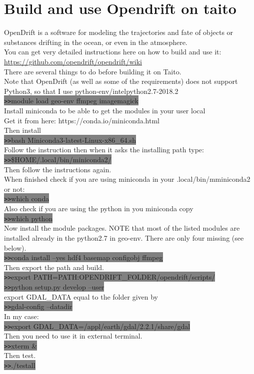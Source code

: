 \documentclass[11pt]{article}
\begin{document}
\section{Build and use Opendrift on taito}
OpenDrift is a software for modeling the trajectories and fate of objects or substances drifting in the ocean, or even in the atmosphere.\\
You can get very detailed instructions here on how to build and use it:\\
\url{https://github.com/opendrift/opendrift/wiki}\\
There are several things to do before building it on Taito.\\
Note that OpenDrift (as well as some of the requirements) does not support Python3, so that I use python-env/intelpython2.7-2018.2\\
\colorbox{Grey}{\texttt{>>}module load geo-env ffmpeg imagemagick}\\
Install miniconda to be able to get the modules in your user local\\
Get it from here:
https://conda.io/miniconda.html\\
Then install \\
\colorbox{Grey}{\texttt{>>}bash Miniconda3-latest-Linux-x86\_64.sh}\\
Follow the instruction then when it asks the installing path type:\\
\colorbox{Grey}{\texttt{>>}\$HOME/.local/bin/miniconda2/}\\
Then follow the instructions again.\\
When finished check if you are using miniconda in your .local/bin/mminiconda2 or not:\\
\colorbox{Grey}{\texttt{>>}which conda}\\
Also check if you are using the python in you miniconda copy\\
\colorbox{Grey}{\texttt{>>}which python}\\
Now install the module packages. NOTE that most of the listed modules are installed already in the python2.7 in geo-env. There are only four missing (see below).\\ 
\colorbox{Grey}{\texttt{>>}conda install --yes hdf4 basemap configobj ffmpeg}\\
Then export the path and build.\\
\colorbox{Grey}{\texttt{>>}export PATH=\textdollar PATH:\textdollar OPENDRIFT\_FOLDER/opendrift/scripts/}\\
\colorbox{Grey}{\texttt{>>}python setup.py develop --user}\\
export GDAL\_DATA equal to the folder given by\\
\colorbox{Grey}{\texttt{>>}gdal-config --datadir}\\
In my case: \\
\colorbox{Grey}{\texttt{>>}export GDAL\_DATA=/appl/earth/gdal/2.2.1/share/gdal}\\
Then you need to use it in external terminal.\\
\colorbox{Grey}{\texttt{>>}xterm \&}\\
Then test.\\
\colorbox{Grey}{\texttt{>>}./testall}\\
\end{document}
